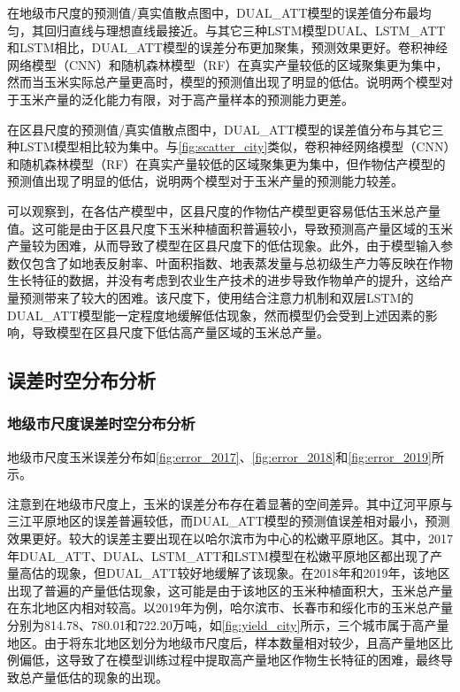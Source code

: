 \begin{figure}
  \centering
  \hfill
\end{figure}

\par 在地级市尺度的预测值/真实值散点图中，DUAL\_ATT模型的误差值分布最均匀，其回归直线与理想直线最接近。与其它三种LSTM模型DUAL、LSTM\_ATT和LSTM相比，DUAL\_ATT模型的误差分布更加聚集，预测效果更好。卷积神经网络模型（CNN）和随机森林模型（RF）在真实产量较低的区域聚集更为集中，然而当玉米实际总产量更高时，模型的预测值出现了明显的低估。说明两个模型对于玉米产量的泛化能力有限，对于高产量样本的预测能力更差。

\par 在区县尺度的预测值/真实值散点图中，DUAL\_ATT模型的误差值分布与其它三种LSTM模型相比较为集中。与\autoref{fig:scatter_city}类似，卷积神经网络模型（CNN）和随机森林模型（RF）在真实产量较低的区域聚集更为集中，但作物估产模型的预测值出现了明显的低估，说明两个模型对于玉米产量的预测能力较差。

\par 可以观察到，在各估产模型中，区县尺度的作物估产模型更容易低估玉米总产量值。这可能是由于区县尺度下玉米种植面积普遍较小，导致预测高产量区域的玉米产量较为困难，从而导致了模型在区县尺度下的低估现象。此外，由于模型输入参数仅包含了如地表反射率、叶面积指数、地表蒸发量与总初级生产力等反映在作物生长特征的数据，并没有考虑到农业生产技术的进步导致作物单产的提升，这给产量预测带来了较大的困难。该尺度下，使用结合注意力机制和双层LSTM的DUAL\_ATT模型能一定程度地缓解低估现象，然而模型仍会受到上述因素的影响，导致模型在区县尺度下低估高产量区域的玉米总产量。

\subsection{误差时空分布分析}
\subsubsection{地级市尺度误差时空分布分析}
\par 地级市尺度玉米误差分布如\autoref{fig:error_2017}、\autoref{fig:error_2018}和\autoref{fig:error_2019}所示。

\par 注意到在地级市尺度上，玉米的误差分布存在着显著的空间差异。其中辽河平原与三江平原地区的误差普遍较低，而DUAL\_ATT模型的预测值误差相对最小，预测效果更好。较大的误差主要出现在以哈尔滨市为中心的松嫩平原地区。其中，2017年DUAL\_ATT、DUAL、LSTM\_ATT和LSTM模型在松嫩平原地区都出现了产量高估的现象，但DUAL\_ATT较好地缓解了该现象。在2018年和2019年，该地区出现了普遍的产量低估现象，这可能是由于该地区的玉米种植面积大，玉米总产量在东北地区内相对较高。以2019年为例，哈尔滨市、长春市和绥化市的玉米总产量分别为814.78、780.01和722.20万吨，如\autoref{fig:yield_city}所示，三个城市属于高产量地区。由于将东北地区划分为地级市尺度后，样本数量相对较少，且高产量地区比例偏低，这导致了在模型训练过程中提取高产量地区作物生长特征的困难，最终导致总产量低估的现象的出现。

